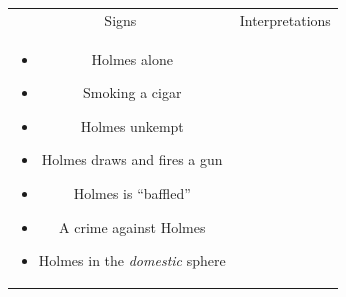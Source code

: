 \documentclass[a4paper,landscape,headrule,footrule,xetex]{foils}
\begin{document}
\begin{tabular}{cc}
Signs & Interpretations \\
  \begin{minipage}{0.45\linewidth}
    \begin{itemize}
    \item Holmes alone
    \item Smoking a cigar
    \item Holmes unkempt
\item Holmes draws and fires a gun
\item Holmes is “baffled”
\item A crime against Holmes
\item Holmes in the \textit{domestic}
sphere
    \end{itemize}
  \end{minipage}
  &
  \begin{minipage}{0.45\linewidth}
  \end{minipage}
\end{tabular}
\newpage
\end{document}

